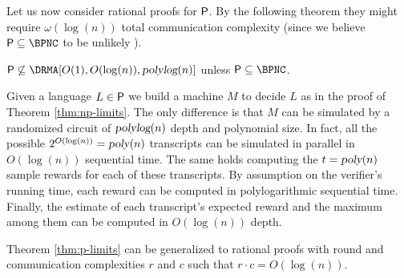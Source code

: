 Let us now consider  rational proofs for $\P$. By the following theorem they might require $\omega(\log(n))$ total communication complexity (since we believe $\P \subseteq \BPNC$ to be unlikely \cite{papakonstantinou2010constructions} ).
\begin{theorem}
	\label{thm:p-limits}
	$\P \not \subseteq \DRMA[O(1), O(\log(n)), \polylog(n)]$  unless $\P \subseteq \BPNC$. 
\end{theorem}
\begin{proofsketch}
	Given a language $L \in \P$ we build a machine $M$ to decide $L$ as in the proof of Theorem \ref{thm:np-limits}.
	The only difference is that  $M$ can be simulated by a randomized circuit of $\polylog(n)$ depth and polynomial size.
	In fact, all the possible $2^{O(\log(n))} = \poly(n)$ transcripts can be simulated in parallel in $O(\log(n))$ sequential time. The same holds computing the $t = \poly(n)$ sample rewards for each of these transcripts. By assumption on the verifier's running time, each reward can be computed in polylogarithmic sequential time. Finally, the estimate of each transcript's expected reward and the maximum among them can be computed in $O(\log(n))$ depth.
\end{proofsketch}

\begin{remark}
	Theorem \ref{thm:p-limits} can be generalized to rational proofs with round and communication complexities $r$ and $c$ such that $r\cdot c = O(\log(n))$.
\end{remark}


